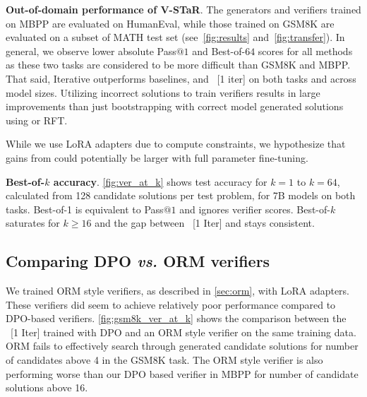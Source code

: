 \textbf{Out-of-domain performance of V-STaR}. The generators and verifiers trained on MBPP are evaluated on HumanEval, while those trained on GSM8K are evaluated on a subset of MATH test set (see~\autoref{fig:results} and~\autoref{fig:transfer}). 
In general, we observe lower absolute Pass$@1$ and Best-of-$64$ scores for all methods as these two tasks are considered to be more difficult than GSM8K and MBPP. That said,
Iterative \vstar{} outperforms baselines, and \vstar{}~[1 iter] on both tasks and across model sizes. 
Utilizing incorrect solutions to train verifiers results in large improvements than just bootstrapping with correct model generated solutions using \stardag or RFT.

While we use LoRA adapters due to compute constraints,  we hypothesize that gains from \vstar{} could potentially be larger with full parameter fine-tuning.



\textbf{Best-of-$k$ accuracy}. \autoref{fig:ver_at_k} shows test accuracy for $k=1$ to $k=64$, calculated from 128 candidate solutions per test problem, for 7B models on both tasks. Best-of-1 is equivalent to Pass$@1$ and ignores verifier scores. Best-of-$k$ saturates for $k\geq16$ and the gap between \vstar{}~[1 Iter] and \vstar{} stays consistent. 






\subsection{Comparing DPO \emph{vs.} ORM verifiers }
\label{sec:dpo}
We trained ORM style verifiers, as described in \autoref{sec:orm}, with LoRA adapters.
These verifiers did seem to achieve relatively poor performance compared to DPO-based verifiers. \autoref{fig:gsm8k_ver_at_k} shows the comparison between the \vstar{}~[1 Iter] trained with DPO and an ORM style verifier on the same training data. ORM fails to effectively search through generated candidate solutions for number of candidates above 4 in the GSM8K task. The ORM style verifier is also performing worse than our DPO based verifier in MBPP for number of candidate solutions above 16.


